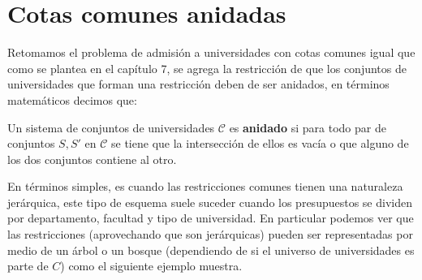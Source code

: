 \chapter{Cotas comunes anidadas}

Retomamos el problema de admisión a universidades con cotas comunes igual que como se plantea en el capítulo 7, se agrega la restricción de que los conjuntos de universidades que forman una restricción deben de ser anidados, en términos matemáticos decimos que:

\begin{dfn}
Un sistema de conjuntos de universidades $\mathcal{C}$ es \textbf{anidado} si para todo par de conjuntos $S,S'$ en $\mathcal{C}$ se tiene que la intersección de ellos es vacía o que alguno de los dos conjuntos contiene al otro. 
\end{dfn}

En términos simples, es cuando las restricciones comunes tienen una naturaleza jerárquica, este tipo de esquema suele suceder cuando los presupuestos se dividen por departamento, facultad y tipo de universidad. En particular podemos ver que las restricciones (aprovechando que son jerárquicas) pueden ser representadas por medio de un árbol o un bosque (dependiendo de si el universo de universidades es parte de $C$) como el siguiente ejemplo muestra. 

